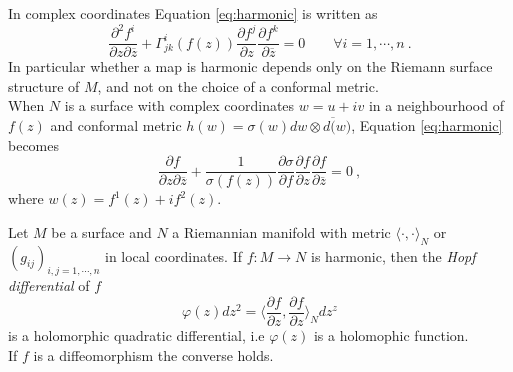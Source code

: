 \noindent In complex coordinates Equation \ref{eq:harmonic} is written as
\[
    \frac{\partial^2 f^i}{\partial z \partial \overline{z}} + \Gamma^i_{jk} (f(z)) \frac{\partial f^j}{\partial z} \frac{\partial f^k}{\partial \overline{z}} = 0 \qquad \forall i = 1, \cdots, n \ .
\]
In particular whether a map is harmonic depends only on the Riemann surface structure of $M$, and not on the choice of a conformal metric.\\
When $N$ is a surface with complex coordinates $w = u + iv$ in a neighbourhood of $f(z)$ and conformal metric $h(w) = \sigma(w) dw \otimes d\overline(w)$, Equation \ref{eq:harmonic} becomes
\begin{equation} \label{eq:harmonic2}
    \frac{\partial f}{ \partial z   \partial \overline{z}} + \frac{1}{\sigma(f(z))} \frac{\partial \sigma}{ \partial f} \frac{\partial f}{\partial z} \frac{\partial f}{\partial \overline{z}} = 0 \ ,
\end{equation}
where $w(z) = f^1(z) + i f^2(z)$.
\begin{theorem} \label{thm:HQD}
    Let $M$ be a surface and $N$ a Riemannian manifold with metric $\langle \cdot,\cdot \rangle_N$ or $(g_{ij})_{i,j = 1, \cdots , n}$ in local coordinates. If $f:M \to N$ is harmonic, then the \textit{Hopf differential} of $f$
    \[
        \varphi(z) dz^2 = \Big\langle \frac{\partial f}{\partial z},  \frac{\partial f}{\partial z} \Big\rangle_N dz^z
    \]
    is a holomorphic quadratic differential, i.e $\varphi(z)$ is a holomophic function. \\
    If $f$ is a diffeomorphism the converse holds.
\end{theorem}
